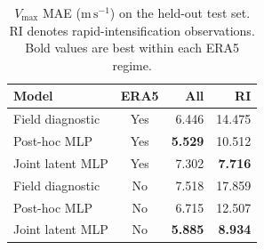\begin{table}[t]
    \centering
    \caption{$V_{\max}$ MAE ($\mathrm{m\,s^{-1}}$) on the held-out test set.
    RI denotes rapid-intensification observations. Bold values are best within
    each ERA5 regime.}
    \label{tab:vmax-architecture-ablation}
    \small
    \setlength{\tabcolsep}{4pt}
    \begin{tabular}{lcrr}
        \toprule
        Model & ERA5 & All & RI \\
        \midrule
        Field diagnostic & Yes & 6.446 & 14.475 \\
        Post-hoc MLP & Yes & \textbf{5.529} & 10.512 \\
        Joint latent MLP & Yes & 7.302 & \textbf{7.716} \\
        \midrule
        Field diagnostic & No & 7.518 & 17.859 \\
        Post-hoc MLP & No & 6.715 & 12.507 \\
        Joint latent MLP & No & \textbf{5.885} & \textbf{8.934} \\
        \bottomrule
    \end{tabular}
\end{table}
